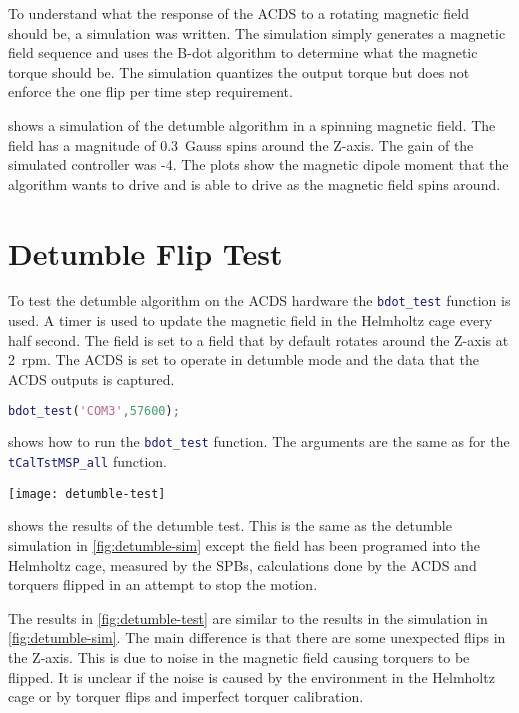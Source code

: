 To understand what the response of the \ac{ACDS} to a rotating magnetic field should be, a simulation was written. The simulation simply generates a magnetic field sequence and uses the B-dot algorithm to determine what the magnetic torque should be. The simulation quantizes the output torque but does not enforce the one flip per time step requirement.


 shows a simulation of the detumble algorithm in a spinning magnetic field. The field has a magnitude of 0.3~Gauss spins around the Z-axis. The gain of the simulated controller was -4. The plots show the magnetic dipole moment that the algorithm wants to drive and is able to drive as the magnetic field spins around.


\section{Detumble Flip Test}

To test the detumble algorithm on the \ac{ACDS} hardware the \lstinline[style=code,language=Matlab]$bdot_test$ function is used. A timer is used to update the magnetic field in the Helmholtz cage every half second. The field is set to a field that by default rotates around the Z-axis at 2~rpm. The \ac{ACDS} is set to operate in detumble mode and the data that the \ac{ACDS} outputs is captured.

\begin{lstlisting}[style=code,caption={Testing B-dot},label={lst:MSP-bdot},language=Matlab]
bdot_test('COM3',57600);
\end{lstlisting}

 shows how to run the \lstinline[style=code,language=Matlab]$bdot_test$ function. The arguments are the same as for the \lstinline[style=code,language=Matlab]$tCalTstMSP_all$ function.

\begin{sidewaysfigure}
    \centering
    \texttt{[image: detumble-test]}
  \caption{Test of the B-dot controller}
    \label{fig:detumble-test}
\end{sidewaysfigure}

 shows the results of the detumble test. This is the same as the detumble simulation in \cref{fig:detumble-sim} except the field has been programed into the Helmholtz cage, measured by the \acp{SPB}, calculations done by the \ac{ACDS} and torquers flipped in an attempt to stop the motion.

The results in \cref{fig:detumble-test} are similar to the results in the simulation in \cref{fig:detumble-sim}. The main difference is that there are some unexpected flips in the Z-axis. This is due to noise in the magnetic field causing torquers to be flipped. It is unclear if the noise is caused by the environment in the Helmholtz cage or by torquer flips and imperfect torquer calibration.


